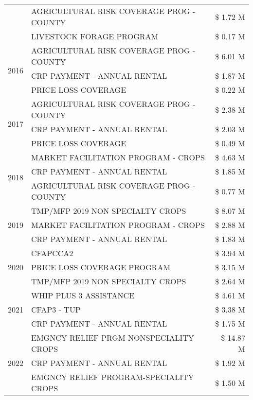 \begin{tabular}{llr}
 & AGRICULTURAL RISK COVERAGE PROG - COUNTY & \$ 1.72 M \\
 & LIVESTOCK FORAGE PROGRAM & \$ 0.17 M \\
\cline{1-3}
\multirow[t]{3}{*}{2016} & AGRICULTURAL RISK COVERAGE PROG - COUNTY & \$ 6.01 M \\
 & CRP PAYMENT - ANNUAL RENTAL & \$ 1.87 M \\
 & PRICE LOSS COVERAGE & \$ 0.22 M \\
\cline{1-3}
\multirow[t]{3}{*}{2017} & AGRICULTURAL RISK COVERAGE PROG - COUNTY & \$ 2.38 M \\
 & CRP PAYMENT - ANNUAL RENTAL & \$ 2.03 M \\
 & PRICE LOSS COVERAGE & \$ 0.49 M \\
\cline{1-3}
\multirow[t]{3}{*}{2018} & MARKET FACILITATION PROGRAM - CROPS & \$ 4.63 M \\
 & CRP PAYMENT - ANNUAL RENTAL & \$ 1.85 M \\
 & AGRICULTURAL RISK COVERAGE PROG - COUNTY & \$ 0.77 M \\
\cline{1-3}
\multirow[t]{3}{*}{2019} & TMP/MFP 2019 NON SPECIALTY CROPS & \$ 8.07 M \\
 & MARKET FACILITATION PROGRAM - CROPS & \$ 2.88 M \\
 & CRP PAYMENT - ANNUAL RENTAL & \$ 1.83 M \\
\cline{1-3}
\multirow[t]{3}{*}{2020} & CFAPCCA2 & \$ 3.94 M \\
 & PRICE LOSS COVERAGE PROGRAM & \$ 3.15 M \\
 & TMP/MFP 2019 NON SPECIALTY CROPS & \$ 2.64 M \\
\cline{1-3}
\multirow[t]{3}{*}{2021} & WHIP PLUS 3 ASSISTANCE & \$ 4.61 M \\
 & CFAP3 - TUP & \$ 3.38 M \\
 & CRP PAYMENT - ANNUAL RENTAL & \$ 1.75 M \\
\cline{1-3}
\multirow[t]{3}{*}{2022} & EMGNCY RELIEF PRGM-NONSPECIALITY CROPS & \$ 14.87 M \\
 & CRP PAYMENT - ANNUAL RENTAL & \$ 1.92 M \\
 & EMGNCY RELIEF PROGRAM-SPECIALITY CROPS & \$ 1.50 M \\
\cline{1-3}
\bottomrule
\end{tabular}
